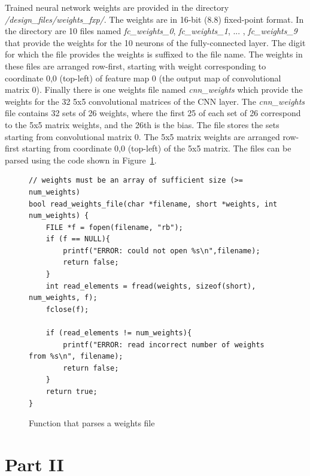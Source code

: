 \documentclass[epsfig,10pt,fullpage]{article}
\begin{document}
Trained neural network weights are provided in the directory \textit{/design\_files/weights\_fxp/}. The weights are in 16-bit (8.8) fixed-point format.
In the directory are 10 files named 
\textit{fc\_weights\_0}, \textit{fc\_weights\_1}, ... , \textit{fc\_weights\_9} that provide the weights for the 10 neurons of the fully-connected layer.
The digit for which the file provides the weights is suffixed to the file name.
The weights in these files are arranged row-first, starting with weight corresponding to coordinate 0,0 (top-left) of feature map 0 (the output map of convolutional matrix 0). 
Finally there is one weights file named \textit{cnn\_weights} which provide the weights for the 32 5x5 convolutional matrices of the CNN layer.
The \textit{cnn\_weights} file contains 32 sets of 26 weights, where the first 25 of each set of 26 correspond to the 5x5 matrix weights, and the 26th 
is the bias. The file stores the sets starting from convolutional matrix 0. The 5x5 matrix weights are arranged row-first starting from coordinate 0,0 (top-left) of the 5x5 matrix. 
The files can be parsed using the code shown in Figure~\ref{fig:parse_weights_code}. 

\lstset{language=C++}
\begin{figure}[H]
\begin{center}
\begin{minipage}[t]{16 cm}
\begin{lstlisting}
// weights must be an array of sufficient size (>= num_weights)
bool read_weights_file(char *filename, short *weights, int num_weights) {
	FILE *f = fopen(filename, "rb");
	if (f == NULL){
		printf("ERROR: could not open %s\n",filename);
		return false;
	}
	int read_elements = fread(weights, sizeof(short), num_weights, f);
	fclose(f);
	
	if (read_elements != num_weights){
		printf("ERROR: read incorrect number of weights from %s\n", filename);
		return false;
	}
	return true;
}
\end{lstlisting}
\end{minipage}
\end{center}
\vspace{-0.33in}\caption{Function that parses a weights file}
\label{fig:parse_weights_code}
\end{figure}

\section*{Part II}
\end{document}
